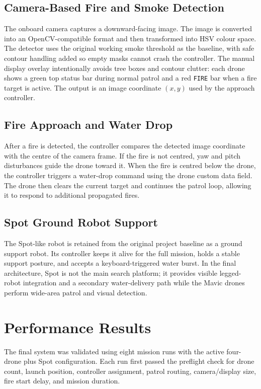 \documentclass[10pt,a4paper]{article}
\begin{document}
\subsection{Camera-Based Fire and Smoke Detection}
The onboard camera captures a downward-facing image. The image is converted into an OpenCV-compatible format and then transformed into HSV colour space. The detector uses the original working smoke threshold as the baseline, with safe contour handling added so empty masks cannot crash the controller. The manual display overlay intentionally avoids tree boxes and contour clutter: each drone shows a green top status bar during normal patrol and a red \texttt{FIRE} bar when a fire target is active. The output is an image coordinate $(x,y)$ used by the approach controller.

\subsection{Fire Approach and Water Drop}
After a fire is detected, the controller compares the detected image coordinate with the centre of the camera frame. If the fire is not centred, yaw and pitch disturbances guide the drone toward it. When the fire is centred below the drone, the controller triggers a water-drop command using the drone custom data field. The drone then clears the current target and continues the patrol loop, allowing it to respond to additional propagated fires.

\subsection{Spot Ground Robot Support}
The Spot-like robot is retained from the original project baseline as a ground support robot. Its controller keeps it alive for the full mission, holds a stable support posture, and accepts a keyboard-triggered water burst. In the final architecture, Spot is not the main search platform; it provides visible legged-robot integration and a secondary water-delivery path while the Mavic drones perform wide-area patrol and visual detection.

\section{Performance Results}
The final system was validated using eight mission runs with the active four-drone plus Spot configuration. Each run first passed the preflight check for drone count, launch position, controller assignment, patrol routing, camera/display size, fire start delay, and mission duration.
\end{document}
